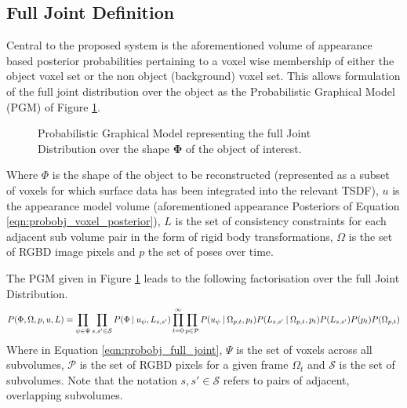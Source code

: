 \subsection{Full Joint Definition}
\label{subsec:probobj_full_joint}
Central to the proposed system is the aforementioned volume of appearance based
posterior probabilities pertaining to a voxel wise membership of either the
object voxel set or the non object (background) voxel set. This allows
formulation of the full joint distribution over the object as the Probabilistic
Graphical Model (PGM) of Figure \ref{fig:probobj_pgm1}.
\begin{figure}[h]
  \label{fig:probobj_pgm1}
  \centering
  \caption[Probabilistic Object Reconstruction Formulation I]
  {Probabilistic Graphical Model representing the full Joint
    Distribution over the shape $\mathbf{\Phi}$ of the object of interest.}
\end{figure}

Where $\Phi$ is the shape of the object to be reconstructed (represented as a
subset of voxels for which surface data has been integrated into the relevant
TSDF), $u$ is the appearance model volume (aforementioned appearance Posteriors 
of Equation \ref{eqn:probobj_voxel_posterior}), $L$ is the set of consistency 
constraints for each adjacent sub volume pair in the form of rigid body 
transformations, $\Omega$ is the set of RGBD image pixels and $p$ the set of 
poses over time.

The PGM given in Figure \ref{fig:probobj_pgm1} leads to the following
factorisation over the full Joint Distribution.
\begin{equation}
  \label{eqn:probobj_full_joint}
  P(\Phi, \Omega, p, u, L) = 
  \prod_{\psi \in \Psi}\prod_{s, s' \in \mathcal{S}}
  P(\Phi \:\vert\: u_{\psi}, L_{s, s'}) 
  \prod_{t=0}^{\infty}\prod_{p \in \mathcal{P}}
  P(u_{\psi} \:\vert\: \Omega_{p, t}, p_{t})
  P(L_{s, s'} \:\vert\: \Omega_{p, t}, p_{t})
  P(L_{s, s'})P(p_{t})P(\Omega_{p, t})
\end{equation}
Where in Equation \ref{eqn:probobj_full_joint}, $\Psi$ is the set of voxels
across all subvolumes, $\mathcal{P}$ is the set of RGBD pixels for a given 
frame $\Omega_{t}$ and $\mathcal{S}$ is the set of subvolumes. Note that the 
notation $s, s' \in \mathcal{S}$ refers to pairs of adjacent, overlapping 
subvolumes.

